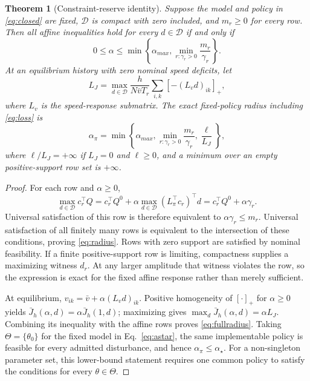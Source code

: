 \documentclass[11pt]{article}
\newtheorem{theorem}{Theorem}
\newcommand{\astar}{\alpha_\star}
\begin{document}
\begin{theorem}[Constraint-reserve identity]\label{thm:reserve}
Suppose the model and policy in \eqref{eq:closed} are fixed, $\mathcal D$ is compact with zero included, and $m_r\geq0$ for every row. Then all affine inequalities hold for every $d\in\mathcal D$ if and only if
\begin{equation}
0\leq\alpha\leq\min\left\{\alpha_{max},\min_{r:\gamma_r>0}\frac{m_r}{\gamma_r}\right\}.
\label{eq:radius}
\end{equation}
At an equilibrium history with zero nominal speed deficits, let
\begin{equation}
L_J=\max_{d\in\mathcal D}\frac{h}{N\bar vT_r}
\sum_{i,k}[-(L_vd)_{ik}]_+,
\end{equation}
where $L_v$ is the speed-response submatrix. The exact fixed-policy radius including \eqref{eq:loss} is
\begin{equation}
\alpha_\pi=\min\left\{\alpha_{max},\min_{r:\gamma_r>0}\frac{m_r}{\gamma_r},\frac{\ell}{L_J}\right\},
\label{eq:fullradius}
\end{equation}
where $\ell/L_J=+\infty$ if $L_J=0$ and $\ell\geq0$, and a minimum over an empty positive-support row set is $+\infty$.
\end{theorem}
\begin{proof}
For each row and $\alpha\geq0$,
\begin{equation}
\max_{d\in\mathcal D}c_r^\top Q
=c_r^\top Q^0+\alpha\max_{d\in\mathcal D}(L_\pi^\top c_r)^\top d
=c_r^\top Q^0+\alpha\gamma_r.
\end{equation}
Universal satisfaction of this row is therefore equivalent to $\alpha\gamma_r\leq m_r$. Universal satisfaction of all finitely many rows is equivalent to the intersection of these conditions, proving \eqref{eq:radius}. Rows with zero support are satisfied by nominal feasibility. If a finite positive-support row is limiting, compactness supplies a maximizing witness $d_r$. At any larger amplitude that witness violates the row, so the expression is exact for the fixed affine response rather than merely sufficient.

At equilibrium, $v_{ik}=\bar v+\alpha(L_vd)_{ik}$. Positive homogeneity of $[\cdot]_+$ for $\alpha\geq0$ yields $\bar J_h(\alpha,d)=\alpha\bar J_h(1,d)$; maximizing gives $\max_d\bar J_h(\alpha,d)=\alpha L_J$. Combining its inequality with the affine rows proves \eqref{eq:fullradius}. Taking $\Theta=\{\theta_0\}$ for the fixed model in Eq.~\eqref{eq:astar}, the same implementable policy is feasible for every admitted disturbance, and hence $\alpha_\pi\leq\astar$. For a non-singleton parameter set, this lower-bound statement requires one common policy to satisfy the conditions for every $\theta\in\Theta$.
\end{proof}
\end{document}
